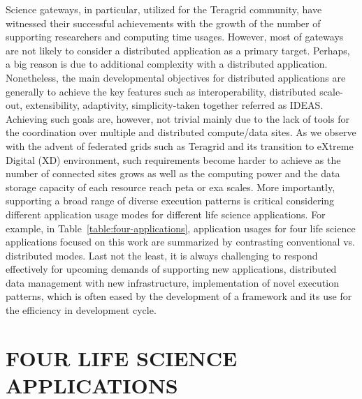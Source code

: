 \documentclass{sig-alternate}
\begin{document}
Science gateways, in particular, utilized for the Teragrid community, have witnessed their successful achievements with the growth of the number of supporting researchers and computing time usages.  However, most of gateways are not likely to consider a distributed application as a primary target.  Perhaps, a big reason is due to additional complexity with a distributed application.  Nonetheless, the main developmental objectives for distributed applications are generally to achieve the key features such as interoperability, distributed scale-out, extensibility, adaptivity, simplicity-taken together referred as IDEAS.  Achieving such goals are, however, not trivial mainly due to the lack of tools for the coordination over multiple and distributed compute/data sites.  As we observe with the advent of federated grids such as Teragrid and its transition to eXtreme Digital (XD) environment, such requirements become harder to achieve as the number of connected sites grows as well as the computing power and the data storage capacity of each resource reach peta or exa scales.   More importantly, supporting a broad range of diverse execution patterns is critical considering different application usage modes for different life science applications.  For example, in Table~\ref{table:four-applications}, application usages for four life science applications focused on this work are summarized by contrasting conventional vs. distributed modes.  Last not the least, it is always challenging to respond effectively for upcoming demands of supporting new applications, distributed data management with new infrastructure, implementation of novel execution patterns, which is often eased by the development of a framework and its use for the efficiency in development cycle.   



\section{FOUR LIFE SCIENCE APPLICATIONS}
\end{document}
